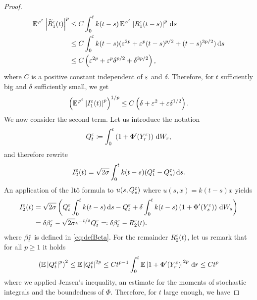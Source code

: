 \documentclass[10pt]{article}
\begin{document}
\begin{appendices}
\begin{proof}
	\begin{equation}
	\begin{aligned}
		\operatorname{\mathbb{E}}^{\varphi^\varepsilon}\left\lvert\widetilde R_1^\varepsilon(t)\right\rvert^p &\leq C \int_0^t k(t-s)\operatorname{\mathbb{E}}^{\varphi^\varepsilon} \left\lvert R_1^\varepsilon(t-s)\right\rvert^p \,\mathrm{d} s\\
		&\leq C \int_0^t k(t-s)(\varepsilon^{2p} + \varepsilon^p(t-s)^{p/2}+(t-s)^{3p/2}) \,\mathrm{d} s\\
		&\leq C \left( \varepsilon^{2p} + \varepsilon^p \delta^{p/2} + \delta^{3p/2} \right),
	\end{aligned}
	\end{equation}
	where $C$ is a positive constant independent of $\varepsilon$ and $\delta$. Therefore, for $t$ sufficiently big and $\delta$ sufficiently small, we get
	\begin{equation}
		\left(\operatorname{\mathbb{E}}^{\varphi^\varepsilon}\left\lvert I_1^\varepsilon(t)\right\rvert^{p}\right)^{1/p} \leq C \left( \delta + \varepsilon^2 + \varepsilon \delta^{1/2} \right).
	\end{equation}
	We now consider the second term. Let us introduce the notation  
	\begin{equation}
		Q_t^\varepsilon \coloneqq \int_0^t \left(1 + \Phi'(Y_r^\varepsilon)\right) \,\mathrm{d} W_r,
	\end{equation}
	and therefore rewrite
	\begin{equation}
		I_2^\varepsilon(t) = \sqrt{2\sigma} \int_0^t k(t-s)(Q_t^\varepsilon - Q_s^\varepsilon) \,\mathrm{d} s.
	\end{equation}
	An application of the Itô formula to $u(s, Q_s^\varepsilon)$ where $u(s, x) = k(t-s)x$ yields
	\begin{equation}
	\begin{aligned}
		I_2^\varepsilon(t) &= \sqrt{2\sigma} \left(Q_t^\varepsilon\int_0^t k(t-s) \,\mathrm{d} s - Q_t^\varepsilon + \delta \int_0^t k(t-s)\left(1 + \Phi'(Y_s^\varepsilon)\right) \,\mathrm{d} W_s\right)\\
		  			&= \delta \beta_t^\varepsilon - \sqrt{2\sigma} e^{-t/\delta} Q_t^\varepsilon \eqqcolon \delta \beta_t^\varepsilon - R_2^\varepsilon(t).
	\end{aligned}
	\end{equation}
	where $\beta_t^\varepsilon$ is defined in \eqref{eq:defBeta}. For the remainder $R_2^\varepsilon(t)$, let us remark that for all $p \geq 1$ it holds
	\begin{equation}
	\begin{aligned}
		\left(\operatorname{\mathbb{E}}\left\lvert Q_t^\varepsilon\right\rvert^p\right)^2 \leq \operatorname{\mathbb{E}}\left\lvert Q_t^\varepsilon\right\rvert^{2p} \leq Ct^{p-1}\int_0^t \operatorname{\mathbb{E}} \left\lvert1 + \Phi'(Y_r^\varepsilon)\right\rvert^{2p} \,\mathrm{d} r \leq C t^p
	\end{aligned}
	\end{equation}
	where we applied Jensen's inequality, an estimate for the moments of stochastic integrals \cite[Formula (3.25), p. 163]{KaS91} and the boundedness of $\Phi$. Therefore, for $t$ large enough, we have

\end{proof}
\end{appendices}
\end{document}
